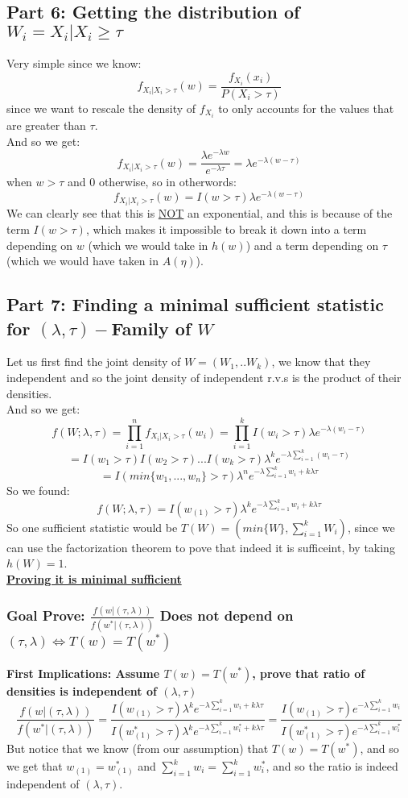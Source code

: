 \documentclass[12pt]{article}
\begin{document}
\subsection*{Part 6: Getting the distribution of $W_i = X_i|X_i \geq \tau$}
Very simple since we know: 
\[
f_{X_i|X_i>\tau}(w) = \frac{f_{X_i}(x_i)}{P(X_i>\tau)}
\]
since we want to rescale the density of $f_{X_i}$ to only accounts for the values that are greater than $\tau$. \\
And so we get:
\[
f_{X_i|X_i>\tau}(w) = \frac{\lambda e^{-\lambda w}}{e^{-\lambda \tau}} = \lambda e^{-\lambda(w-\tau)}
\]
when $w>\tau$ and 0 otherwise, so in otherwords: 
\[
  f_{X_i|X_i>\tau}(w) =  I(w>\tau)\lambda e^{-\lambda(w-\tau)}
\]
We can clearly see that this is \underline{NOT} an exponential, and this is because of the term $I(w>\tau)$, which makes it impossible to break it down into a term depending on $w$ (which we would take in $h(w)$) and a term depending on $\tau$(which we would have taken in $A(\eta)$).
\subsection*{Part 7: Finding a minimal sufficient statistic for $(\lambda,\tau)-$Family of $W$}
Let us first find the joint density of $W=(W_1,..W_k)$, we know that they independent and so the joint density of independent r.v.s is the product of their densities. \\
And so we get:
\[
f(W;\lambda,\tau) = \prod_{i=1}^{n}f_{X_i|X_i>\tau}(w_i) = \prod_{i=1}^{k}I(w_i>\tau)\lambda e^{-\lambda(w_i-\tau)}
\]
\[
 = I(w_1>\tau)I(w_2>\tau)...I(w_k>\tau)\lambda^k e^{-\lambda\sum_{i=1}^{k}(w_i-\tau)}
\]
\[
= I(min\{w_1,...,w_n\}>\tau)\lambda^n e^{-\lambda\sum_{i=1}^{k}w_i +  k\lambda\tau}
\]
So we found: 
\[
f(W;\lambda,\tau) = I(w_{(1)}>\tau)\lambda^k e^{-\lambda\sum_{i=1}^{k}w_i +  k\lambda\tau}
\]
So one sufficient statistic would be $T(W)= (min\{W\}, \sum_{i=1}^{k}W_i)$, since we can use the factorization theorem to pove that indeed it is sufficeint, by taking $h(W) = 1$. \\ \textbf{\underline{Proving it is minimal sufficient}}\\  
\subsubsection*{Goal Prove: $\frac{f(w|(\tau,\lambda) )}{f(w^*|(\tau,\lambda) )}$ Does not depend on$ (\tau,\lambda) \iff T(w) = T(w^*)$}
\textbf{First Implications: Assume $T(w) = T(w^*)$, prove that ratio of densities is independent of $(\lambda,\tau)$}
\[
\frac{f(w|(\tau,\lambda) )}{f(w^*|(\tau,\lambda) )} = \frac{I(w_{(1)}>\tau)\lambda^k e^{-\lambda\sum_{i=1}^{k}w_i +  k\lambda\tau}}{I(w^*_{(1)}>\tau)\lambda^k e^{-\lambda\sum_{i=1}^{k}w^*_i +  k\lambda\tau}} = \frac{I(w_{(1)}>\tau)e^{-\lambda\sum_{i=1}^{k}w_i}}{I(w^*_{(1)}>\tau)e^{-\lambda\sum_{i=1}^{k}w^*_i}}
\]
But notice that we know (from our assumption) that $T(w) = T(w^*)$, and so we get that $w_{(1)} = w^*_{(1)}$ and $\sum_{i=1}^{k}w_i = \sum_{i=1}^{k}w^*_i$, and so the ratio is indeed independent of $(\lambda,\tau)$.
\end{document}
